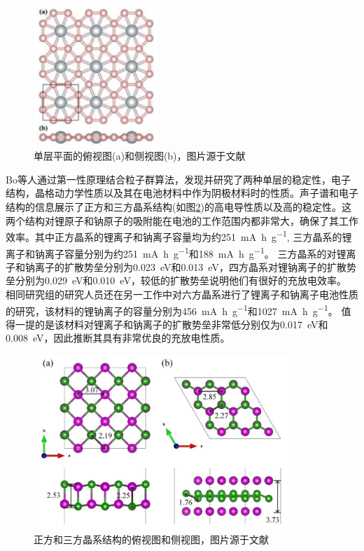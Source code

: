 \begin{figure}[bt]
  \includegraphics[width=0.42\textwidth]{figs/ch1_tib4.png}
  \centering
  \caption{单层平面的俯视图(a)和侧视图(b)，图片源于文献\cite{qu2017two}}
  \label{fig:ch1_tib4}
\end{figure}

Bo等人\cite{bo2019tetragonal}通过第一性原理结合粒子群算法，发现并研究了两种单层的稳定性，电子结构，晶格动力学性质以及其在电池材料中作为阴极材料时的性质。声子谱和电子结构的信息展示了正方和三方晶系结构(如图\ref{fig:ch1_mo2b2})的高电导性质以及高的稳定性。这两个结构对锂原子和钠原子的吸附能在电池的工作范围内都非常大，确保了其工作效率。其中正方晶系的锂离子和钠离子容量均为约\SI{251}{\mA\hour\per\g}, 三方晶系的锂离子和钠离子容量分别为约\SI{251}{\mA\hour\per\g}和\SI{188}{\mA\hour\per\g}。
三方晶系的对锂离子和钠离子的扩散势垒分别为\SI{0.023}{\eV}和\SI{0.013}{\eV}，四方晶系对锂钠离子的扩散势垒分别为\SI{0.029}{\eV}和\SI{0.010}{\eV}，较低的扩散势垒说明他们有很好的充放电效率。
相同研究组的研究人员还在另一工作中对六方晶系\cite{bo2018hexagonal}进行了锂离子和钠离子电池性质的研究，该材料的锂钠离子的容量分别为\SI{456}{\mA\hour\per\g}和\SI{1027}{\mA\hour\per\g}。
值得一提的是该材料对锂离子和钠离子的扩散势垒非常低分别仅为\SI{0.017}{\eV}和\SI{0.008}{\eV}，因此推断其具有非常优良的充放电性质。

\begin{figure}[bt]
  \includegraphics[width=0.86\textwidth]{figs/ch1_mo2b2.png}
  \centering
  \caption{正方和三方晶系结构的俯视图和侧视图，图片源于文献\cite{bo2019tetragonal}}
  \label{fig:ch1_mo2b2}
\end{figure}

